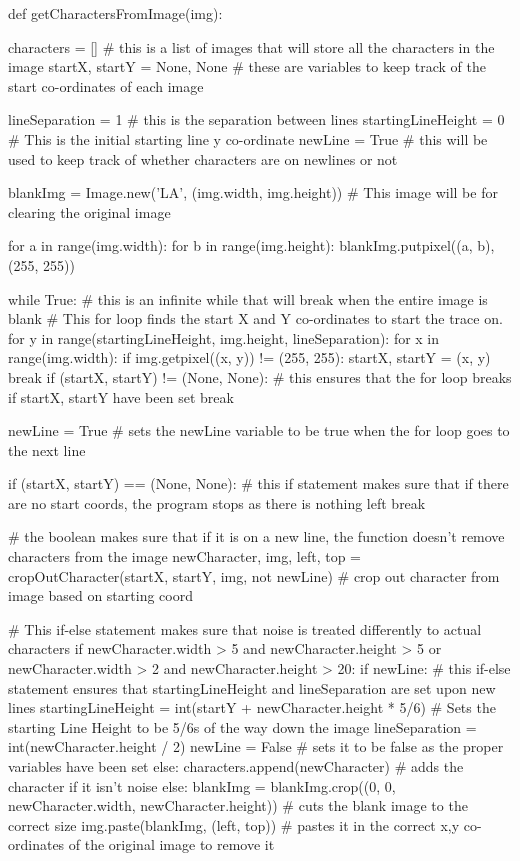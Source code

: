 \documentclass{report}
\begin{document}
\begin{python}
def getCharactersFromImage(img):

    characters = []  # this is a list of images that will store all the characters in the image
    startX, startY = None, None  # these are variables to keep track of the start co-ordinates of each image
    
    lineSeparation = 1  # this is the separation between lines
    startingLineHeight = 0  # This is the initial starting line y co-ordinate
    newLine = True  # this will be used to keep track of whether characters are on newlines or not

    blankImg = Image.new('LA', (img.width, img.height))  # This image will be for clearing the original image
    
    for a in range(img.width):
        for b in range(img.height):
            blankImg.putpixel((a, b), (255, 255))

    while True:  # this is an infinite while that will break when the entire image is blank
        #  This for loop finds the start X and Y co-ordinates to start the trace on.
        for y in range(startingLineHeight, img.height, lineSeparation):
            for x in range(img.width):
                if img.getpixel((x, y)) != (255, 255):
                    startX, startY = (x, y)
                    break
            if (startX, startY) != (None, None):  # this ensures that the for loop breaks if startX, startY have been set
                break

            newLine = True  # sets the newLine variable to be true when the for loop goes to the next line

        if (startX, startY) == (None, None):  # this if statement makes sure that if there are no start coords, the program stops as there is nothing left
            break

        # the boolean makes sure that if it is on a new line, the function doesn't remove characters from the image
        newCharacter, img, left, top = cropOutCharacter(startX, startY, img, not newLine)  # crop out character from image based on starting coord

        #  This if-else statement makes sure that noise is treated differently to actual characters
        if newCharacter.width > 5 and newCharacter.height > 5 or newCharacter.width > 2 and newCharacter.height > 20:
            if newLine:  # this if-else statement ensures that startingLineHeight and lineSeparation are set upon new lines
                startingLineHeight = int(startY + newCharacter.height * 5/6)  # Sets the starting Line Height to be 5/6s of the way down the image
                lineSeparation = int(newCharacter.height / 2)
                newLine = False  # sets it to be false as the proper variables have been set
            else:
                characters.append(newCharacter)  # adds the character if it isn't noise
        else:
            blankImg = blankImg.crop((0, 0, newCharacter.width, newCharacter.height))  # cuts the blank image to the correct size
            img.paste(blankImg, (left, top))  # pastes it in the correct x,y co-ordinates of the original image to remove it


\end{python}
\end{document}
